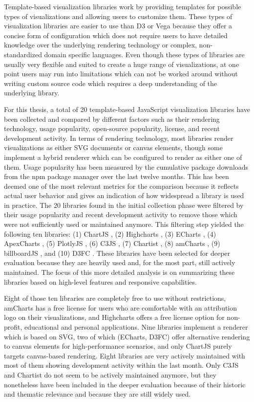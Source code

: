 Template-based visualization libraries work by providing templates for possible types of visualizations and allowing users to customize them.
These types of visualization libraries are easier to use than D3 or Vega because they offer a concise form of configuration which does not require users to have detailed knowledge over the underlying rendering technology or complex, non-standardized domain specific languages.
Even though these types of libraries are usually very flexible and suited to create a huge range of visualizations, at one point users may run into limitations which can not be worked around without writing custom source code which requires a deep understanding of the underlying library.

For this thesis, a total of 20 template-based JavaScript visualization libraries have been collected and compared by different factors such as their rendering technology, usage popularity, open-source popularity, license, and recent development activity.
In terms of rendering technology, most libraries render visualizations as either SVG documents or canvas elements, though some implement a hybrid renderer which can be configured to render as either one of them.
Usage popularity has been measured by the cumulative package downloads from the npm package manager over the last twelve months.
This has been deemed one of the most relevant metrics for the comparison because it reflects actual user behavior and gives an indication of how widespread a library is used in practice.
The 20 libraries found in the initial collection phase were filtered by their usage popularity and recent development activity to remove those which were not sufficiently used or maintained anymore.
This filtering step yielded the following ten libraries: (1) ChartJS \parencite{ChartJS}, (2) Highcharts \parencite{Highcharts}, (3) ECharts \parencite{ECharts}, (4) ApexCharts \parencite{ApexCharts}, (5) PlotlyJS \parencite{PlotlyJS}, (6) C3JS \parencite{C3JS}, (7) Chartist \parencite{Chartist}, (8) amCharts \parencite{amCharts}, (9) billboardJS \parencite{billboardJS}, and (10) D3FC \parencite{D3FC}.
These libraries have been selected for deeper evaluation because they are heavily used and, for the most part, still actively maintained.
The focus of this more detailed analysis is on summarizing these libraries based on high-level features and responsive capabilities.

Eight of those ten libraries are completely free to use without restrictions, amCharts has a free license for users who are comfortable with an attribution logo on their visualizations, and Highcharts offers a free license option for non-profit, educational and personal applications.
Nine libraries implement a renderer which is based on SVG, two of which (ECharts, D3FC) offer alternative rendering to canvas elements for high-performance scenarios, and only ChartJS purely targets canvas-based rendering.
Eight libraries are very actively maintained with most of them showing development activity within the last month.
Only C3JS and Chartist do not seem to be actively maintained anymore, but they nonetheless have been included in the deeper evaluation because of their historic and thematic relevance and because they are still widely used.

